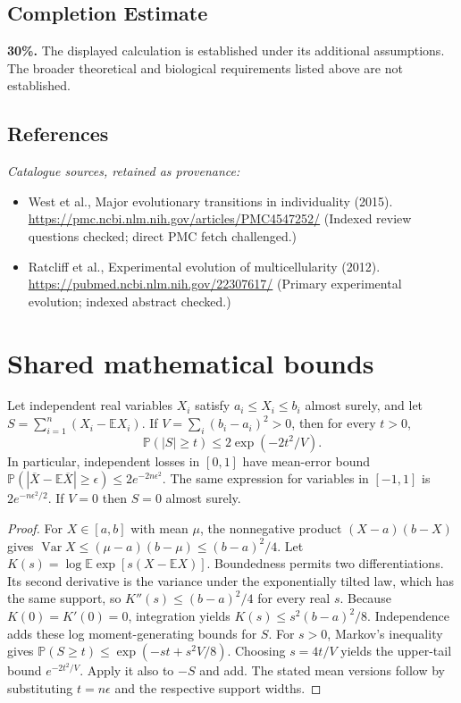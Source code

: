 \documentclass[11pt]{article}
\begin{document}
\subsection{Completion Estimate}
\textbf{30\%.} The displayed calculation is established under its additional assumptions. The broader theoretical and biological requirements listed above are not established.
\subsection{References}
\noindent\emph{Catalogue sources, retained as provenance:}
\begin{itemize}
\item West et al., Major evolutionary transitions in individuality (2015). \url{https://pmc.ncbi.nlm.nih.gov/articles/PMC4547252/} (Indexed review questions checked; direct PMC fetch challenged.)
\item Ratcliff et al., Experimental evolution of multicellularity (2012). \url{https://pubmed.ncbi.nlm.nih.gov/22307617/} (Primary experimental evolution; indexed abstract checked.)
\end{itemize}




\section{Shared mathematical bounds}\label{app:bounds}
\begin{lemma}\label{lem:bounded}
Let independent real variables $X_i$ satisfy $a_i\leq X_i\leq b_i$ almost surely,
and let $S=\sum_{i=1}^n(X_i-\mathbb{E} X_i)$. If
$V=\sum_i(b_i-a_i)^2>0$, then for every $t>0$,
\[
 \mathbb{P}(|S|\geq t)\leq 2\exp(-2t^2/V).
\]
In particular, independent losses in $[0,1]$ have mean-error bound
$\mathbb{P}(|\overline X-\mathbb{E}\overline X|\geq\epsilon)
\leq2e^{-2n\epsilon^2}$. The same expression for variables in $[-1,1]$
is $2e^{-n\epsilon^2/2}$. If $V=0$ then $S=0$ almost surely.
\end{lemma}
\begin{proof}
For $X\in[a,b]$ with mean $\mu$, the nonnegative product
$(X-a)(b-X)$ gives
$\operatorname{Var} X\leq(\mu-a)(b-\mu)\leq(b-a)^2/4$.
Let $K(s)=\log\mathbb{E}\exp[s(X-\mathbb{E} X)]$.
Boundedness permits two differentiations. Its second derivative is the variance
under the exponentially tilted law, which has the same support, so
$K''(s)\leq(b-a)^2/4$ for every real $s$.
Because $K(0)=K'(0)=0$, integration yields
$K(s)\leq s^2(b-a)^2/8$.
Independence adds these log moment-generating bounds for $S$.
For $s>0$, Markov's inequality gives
$\mathbb{P}(S\geq t)\leq\exp(-st+s^2V/8)$.
Choosing $s=4t/V$ yields the upper-tail bound $e^{-2t^2/V}$.
Apply it also to $-S$ and add. The stated mean versions follow by substituting
$t=n\epsilon$ and the respective support widths.
\end{proof}
\end{document}
